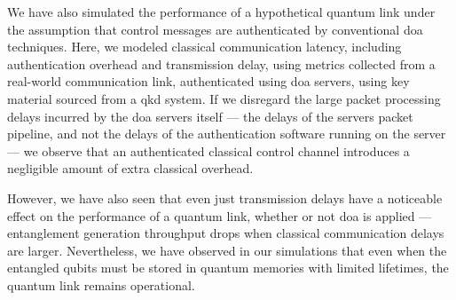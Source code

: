 We have also simulated the performance of a hypothetical quantum link under the assumption that
control messages are authenticated by conventional \acrshort{doa} techniques. Here, we modeled
classical communication latency, including authentication overhead and transmission delay, using
metrics collected from a real-world communication link, authenticated using \acrshort{doa} servers,
using key material sourced from a \acrshort{qkd} system. If we disregard the large packet processing
delays incurred by the \acrshort{doa} servers itself --- the delays of the servers packet pipeline,
and not the delays of the authentication software running on the server --- we observe that an
authenticated classical control channel introduces a negligible amount of extra classical overhead.

However, we have also seen that even just transmission delays have a noticeable effect on the
performance of a quantum link, whether or not \acrlong{doa} is applied --- entanglement generation
throughput drops when classical communication delays are larger. Nevertheless, we have observed in
our simulations that even when the entangled qubits must be stored in quantum memories with limited
lifetimes, the quantum link remains operational.

\begin{xstretch}
\printbibliography[heading=subbibintoc,title={References},notcategory=noprint]
\end{xstretch}
